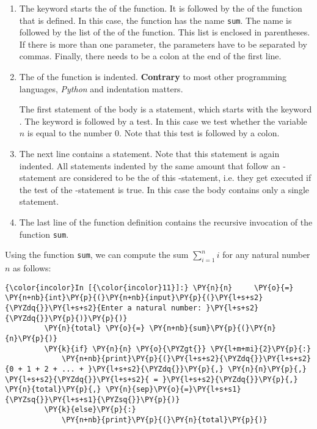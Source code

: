 \begin{enumerate}
\item The keyword \texttt{}  starts the  of the
      function. 
      It is followed by the 
      of the function that is defined.  In this case, the function has the name \texttt{sum}.
      The name is followed by the list of the   of the function.  This list is enclosed in
      parentheses. If there is more than one parameter, the parameters have to be separated by commas.
      Finally, there needs to be a colon at the end of the first line. 
\item The  of the function is indented.   \textbf{Contrary} to most other programming languages, 
     \textsl{Python}  and indentation matters.
    
     The first statement of the body is a  statement, which starts with the keyword
     \texttt{}.  The keyword is followed by a test.  In this case we test whether the variable $n$ 
     is equal to the number $0$.  Note that this test is followed by a colon.
\item The next line contains a \texttt{} statement.  Note that this statement is again indented.
     All statements indented by the same amount that follow an \texttt{}-statement are considered to be
     the  of this \texttt{}-statement, i.e. they get executed if the test of the
     \texttt{}-statement is true.  In this case the body contains only a single statement.

\item The last line of the function definition contains the recursive invocation of the function \texttt{sum}.
\end{enumerate}
Using the function \texttt{sum}, we can compute the sum \(\sum\limits_{i=1}^n i\) for any natural number $n$ 
as follows:
\begin{Verbatim}[commandchars=\\\{\}]
{\color{incolor}In [{\color{incolor}11}]:} \PY{n}{n}     \PY{o}{=} \PY{n+nb}{int}\PY{p}{(}\PY{n+nb}{input}\PY{p}{(}\PY{l+s+s2}{\PYZdq{}}\PY{l+s+s2}{Enter a natural number: }\PY{l+s+s2}{\PYZdq{}}\PY{p}{)}\PY{p}{)}
         \PY{n}{total} \PY{o}{=} \PY{n+nb}{sum}\PY{p}{(}\PY{n}{n}\PY{p}{)}
         \PY{k}{if} \PY{n}{n} \PY{o}{\PYZgt{}} \PY{l+m+mi}{2}\PY{p}{:}
             \PY{n+nb}{print}\PY{p}{(}\PY{l+s+s2}{\PYZdq{}}\PY{l+s+s2}{0 + 1 + 2 + ... + }\PY{l+s+s2}{\PYZdq{}}\PY{p}{,} \PY{n}{n}\PY{p}{,} \PY{l+s+s2}{\PYZdq{}}\PY{l+s+s2}{ = }\PY{l+s+s2}{\PYZdq{}}\PY{p}{,} \PY{n}{total}\PY{p}{,} \PY{n}{sep}\PY{o}{=}\PY{l+s+s1}{\PYZsq{}}\PY{l+s+s1}{\PYZsq{}}\PY{p}{)}
         \PY{k}{else}\PY{p}{:} 
             \PY{n+nb}{print}\PY{p}{(}\PY{n}{total}\PY{p}{)}
\end{Verbatim}


